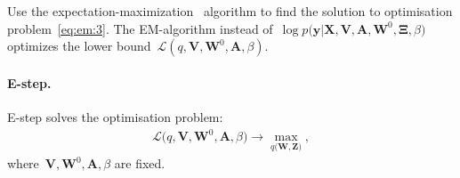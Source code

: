 \documentclass[12pt, twoside]{article}
\numberwithin{equation}{section}
\begin{document}
Use the expectation-maximization~\cite{Dempster1977, bishop2006} algorithm to find the solution to optimisation problem~\eqref{eq:em:3}. The EM-algorithm instead of~$\log p\bigr(\mathbf{y}|\mathbf{X}, \mathbf{V}, \textbf{A}, \textbf{W}^{0}, \bm{\Xi}, \beta\bigr)$ optimizes the lower bound~$\mathcal{L}\left(q, \textbf{V}, \textbf{W}^{0}, \textbf{A}, \beta\right)$.


\paragraph{E-step.} E-step solves the optimisation problem:
\[
\label{eq:em:new:3}
\begin{aligned}
\mathcal{L}\bigr(q, \textbf{V}, \textbf{W}^{0}, \textbf{A}, \beta\bigr) \to \max_{q\bigr(\textbf{W}, \textbf{Z}\bigr)},
\end{aligned}
\]
where~$\textbf{V}, \textbf{W}^{0}, \textbf{A}, \beta$ are fixed.
\end{document}
